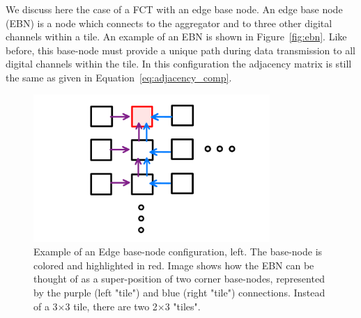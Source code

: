 We discuss here the case of a FCT with an edge base node.
An edge base node (EBN) is a node which connects to the aggregator and to three other digital channels within a tile.
An example of an EBN is shown in Figure~\ref{fig:ebn}.
Like before, this base-node must provide a unique path during data transmission to all digital channels within the tile.
In this configuration the adjacency matrix is still the same as given in Equation~\ref{eq:adjacency_comp}.

\begin{figure}[]
\centering
\includegraphics[width=0.8\textwidth]{images/EBN_superposition.pdf}
\caption{Example of an Edge base-node configuration, left.
The base-node is colored and highlighted in red.
Image shows how the EBN can be thought of as a super-position of two corner base-nodes, represented by the purple (left "tile") and blue (right "tile") connections.
Instead of a 3$\times$3 tile, there are two 2$\times$3 "tiles".
}
\end{figure}~\label{fig:ebn}
